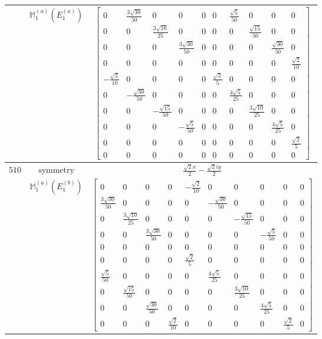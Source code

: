 \documentclass[fleqn,8pt,landscape]{jsarticle}
\begin{document}
\begin{longtable}{ccc}
$  $ & $ \mathbb{M}_{1}^{(a)}(E_{1}^{(a)}) $ & $ \begin{bmatrix} 0 & \frac{3 \sqrt{30}}{50} & 0 & 0 & 0 & 0 & \frac{\sqrt{5}}{50} & 0 & 0 & 0 \\ 0 & 0 & \frac{3 \sqrt{10}}{25} & 0 & 0 & 0 & 0 & \frac{\sqrt{15}}{50} & 0 & 0 \\ 0 & 0 & 0 & \frac{3 \sqrt{30}}{50} & 0 & 0 & 0 & 0 & \frac{\sqrt{30}}{50} & 0 \\ 0 & 0 & 0 & 0 & 0 & 0 & 0 & 0 & 0 & \frac{\sqrt{2}}{10} \\ - \frac{\sqrt{2}}{10} & 0 & 0 & 0 & 0 & \frac{\sqrt{2}}{5} & 0 & 0 & 0 & 0 \\ 0 & - \frac{\sqrt{30}}{50} & 0 & 0 & 0 & 0 & \frac{4 \sqrt{5}}{25} & 0 & 0 & 0 \\ 0 & 0 & - \frac{\sqrt{15}}{50} & 0 & 0 & 0 & 0 & \frac{3 \sqrt{10}}{25} & 0 & 0 \\ 0 & 0 & 0 & - \frac{\sqrt{5}}{50} & 0 & 0 & 0 & 0 & \frac{4 \sqrt{5}}{25} & 0 \\ 0 & 0 & 0 & 0 & 0 & 0 & 0 & 0 & 0 & \frac{\sqrt{2}}{5} \\ 0 & 0 & 0 & 0 & 0 & 0 & 0 & 0 & 0 & 0 \end{bmatrix} $ \\ \hline
$ 510 $ & $ \text{symmetry} $ & $ \frac{\sqrt{2} x}{2} - \frac{\sqrt{2} i y}{2} $ \\
$  $ & $ \mathbb{M}_{1}^{(a)}(E_{1}^{(b)}) $ & $ \begin{bmatrix} 0 & 0 & 0 & 0 & - \frac{\sqrt{2}}{10} & 0 & 0 & 0 & 0 & 0 \\ \frac{3 \sqrt{30}}{50} & 0 & 0 & 0 & 0 & - \frac{\sqrt{30}}{50} & 0 & 0 & 0 & 0 \\ 0 & \frac{3 \sqrt{10}}{25} & 0 & 0 & 0 & 0 & - \frac{\sqrt{15}}{50} & 0 & 0 & 0 \\ 0 & 0 & \frac{3 \sqrt{30}}{50} & 0 & 0 & 0 & 0 & - \frac{\sqrt{5}}{50} & 0 & 0 \\ 0 & 0 & 0 & 0 & 0 & 0 & 0 & 0 & 0 & 0 \\ 0 & 0 & 0 & 0 & \frac{\sqrt{2}}{5} & 0 & 0 & 0 & 0 & 0 \\ \frac{\sqrt{5}}{50} & 0 & 0 & 0 & 0 & \frac{4 \sqrt{5}}{25} & 0 & 0 & 0 & 0 \\ 0 & \frac{\sqrt{15}}{50} & 0 & 0 & 0 & 0 & \frac{3 \sqrt{10}}{25} & 0 & 0 & 0 \\ 0 & 0 & \frac{\sqrt{30}}{50} & 0 & 0 & 0 & 0 & \frac{4 \sqrt{5}}{25} & 0 & 0 \\ 0 & 0 & 0 & \frac{\sqrt{2}}{10} & 0 & 0 & 0 & 0 & \frac{\sqrt{2}}{5} & 0 \end{bmatrix} $ \\ \hline

\end{longtable}
\end{document}
